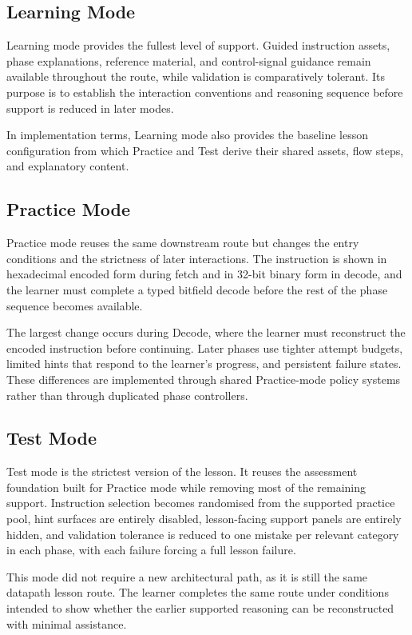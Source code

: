 \subsection{Learning Mode}

Learning mode provides the fullest level of support. Guided instruction assets, phase explanations, reference material, and control-signal guidance remain available throughout the route, while validation is comparatively tolerant. Its purpose is to establish the interaction conventions and reasoning sequence before support is reduced in later modes.

In implementation terms, Learning mode also provides the baseline lesson configuration from which Practice and Test derive their shared assets, flow steps, and explanatory content.

\subsection{Practice Mode}

Practice mode reuses the same downstream route but changes the entry conditions and the strictness of later interactions. The instruction is shown in hexadecimal encoded form during fetch and in 32-bit binary form in decode, and the learner must complete a typed bitfield decode before the rest of the phase sequence becomes available.

The largest change occurs during Decode, where the learner must reconstruct the encoded instruction before continuing. Later phases use tighter attempt budgets, limited hints that respond to the learner's progress, and persistent failure states. These differences are implemented through shared Practice-mode policy systems rather than through duplicated phase controllers.

\subsection{Test Mode}

Test mode is the strictest version of the lesson. It reuses the assessment foundation built for Practice mode while removing most of the remaining support. Instruction selection becomes randomised from the supported practice pool, hint surfaces are entirely disabled, lesson-facing support panels are entirely hidden, and validation tolerance is reduced to one mistake per relevant category in each phase, with each failure forcing a full lesson failure.

This mode did not require a new architectural path, as it is still the same datapath lesson route. The learner completes the same route under conditions intended to show whether the earlier supported reasoning can be reconstructed with minimal assistance.

